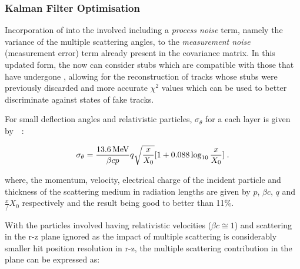 

\subsubsection{Kalman Filter Optimisation}\label{subsubsec:lowPtOptKF}
Incorporation of \MS into the \KF involved including a \emph{process noise} term, namely the variance of the multiple scattering angles, to the \emph{measurement noise} (\ie measurement error) term already present in the \KF covariance matrix.
In this updated form, the \KF now can consider stubs which are compatible with those that have undergone \MS, allowing for the reconstruction of tracks whose stubs were previously discarded and more accurate $\chi^{2}$ values which can be used to better discriminate against states of fake tracks.

For small deflection angles and relativistic particles, $\sigma_{\theta}$ for a each layer is given by~\cite{Lynch:1990sq}~:

\begin{equation}
\sigma_{\theta} = \frac{13.6\,\text{Me\hspace{-.08em}V}}{\beta c p} q \sqrt{\frac{x}{X_{0}}} [1 + 0.088 \log_{10}{\frac{x}{X_{0}}}]  \;.
\label{eq:scatter1}
\end{equation}

where, the momentum, velocity, electrical charge of the incident particle and thickness of the scattering medium in radiation lengths are given by $p$, $\beta c$, $q$ and $\frac{x}/{X_{0}}$ respectively and the result being good to better than 11\%.

With the particles involved having relativistic velocities (\ie $\beta c \cong 1$) and scattering in the r-z plane ignored as the impact of multiple scattering is considerably smaller hit position resolution in r-z, the multiple scattering contribution in the \rphi plane can be expressed as:


